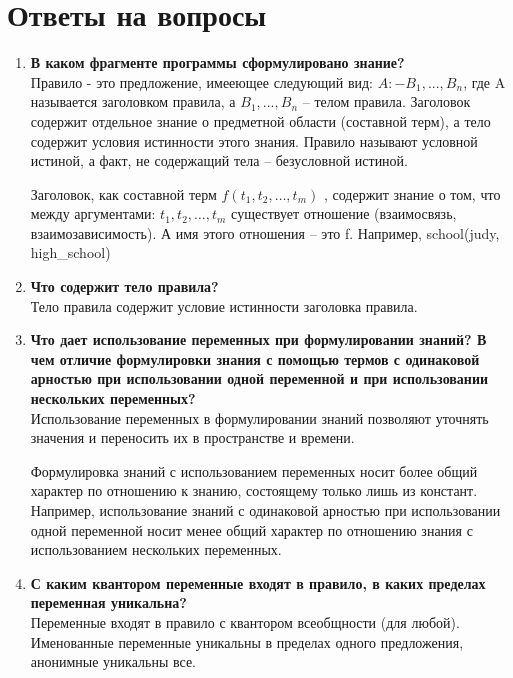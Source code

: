 \newpage
\section*{Ответы на вопросы}
\begin{enumerate}
    \item \textbf{В каком фрагменте программы сформулировано знание?}\\ Правило - это предложение, имееющее следующий вид:
    $A :- B_1,... , B_n$, где 
    A называется заголовком правила, а $B_1,..., B_n$ – телом правила.
    Заголовок содержит отдельное знание о предметной области (составной терм), а тело содержит условия истинности этого знания. Правило называют условной истиной, а факт, не содержащий тела – безусловной истиной.
    
    Заголовок, как составной терм  $f(t_1, t_2, …,t_m)$ , содержит знание о том, что между аргументами: $t_1, t_2, …,t_m$ существует отношение (взаимосвязь, взаимозависимость). А имя этого отношения – это f.  Например,   school(judy, high\_school)      
    
    
    
    \item \textbf{Что содержит тело правила?}\\
    Тело правила содержит условие истинности заголовка правила. 
    
    \item \textbf{Что дает использование переменных при формулировании знаний? В чем отличие формулировки знания с помощью термов с одинаковой арностью при использовании одной переменной и при использовании нескольких переменных? }\\
    Использование переменных в формулировании знаний позволяют уточнять значения и переносить их в пространстве и времени.
    
     Формулировка знаний с использованием переменных носит более общий характер по отношению к знанию, состоящему только лишь из констант. Например, использование знаний с одинаковой арностью при использовании одной переменной носит менее общий характер по отношению знания с использованием нескольких переменных. 

    \item \textbf{С каким квантором переменные входят в правило, в каких пределах переменная уникальна?}\\
    Переменные входят в правило с квантором всеобщности (для любой). Именованные переменные уникальны в пределах одного предложения, анонимные уникальны все. 
	

\end{enumerate}
